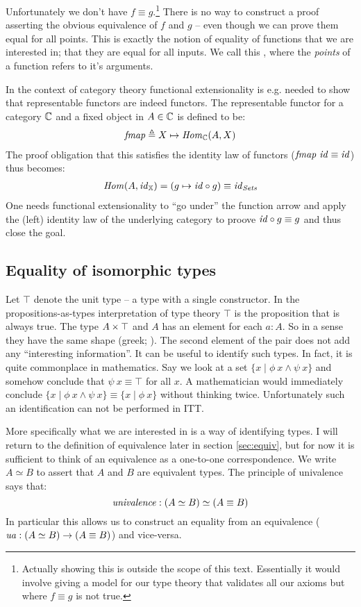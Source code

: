 Unfortunately we don't have $f \equiv g$.\footnote{Actually showing this is
outside the scope of this text. Essentially it would involve giving a model
for our type theory that validates all our axioms but where $f \equiv g$ is
not true.} There is no way to construct a proof asserting the obvious
equivalence of $f$ and $g$ -- even though we can prove them equal for all
points. This is exactly the notion of equality of functions that we are
interested in; that they are equal for all inputs. We call this
, where the \emph{points} of a function refers
to it's arguments.

In the context of category theory functional extensionality is e.g. needed to
show that representable functors are indeed functors. The representable functor
for a category $\mathbb{C}$ and a fixed object in $A \in \mathbb{C}$ is defined to be:
%
\begin{align*}
\mathit{fmap} \mathrel{\triangleq} X \mapsto \mathit{Hom}_{\mathbb{C}}(A, X)
\end{align*}
%
The proof obligation that this satisfies the identity law of functors
($\mathit{fmap}\ \mathit{id} \equiv \mathit{id}$) thus becomes:
%
\begin{align*}
\mathit{Hom}(A, \mathit{id}_{\mathbb{X}}) = (g \mapsto \mathit{id} \circ g) \equiv \mathit{id}_{\mathit{Sets}}
\end{align*}
%
One needs functional extensionality to ``go under'' the function arrow and apply
the (left) identity law of the underlying category to proove $\mathit{id} \circ g
\equiv g$ and thus close the goal.
%
\subsection{Equality of isomorphic types}
%
Let $\top$ denote the unit type -- a type with a single constructor. In the
propositions-as-types interpretation of type theory $\top$ is the proposition
that is always true. The type $A \times \top$ and $A$ has an element for each $a :
A$. So in a sense they have the same shape (greek; ). The
second element of the pair does not add any ``interesting information''. It can
be useful to identify such types. In fact, it is quite commonplace in
mathematics. Say we look at a set $\{x \mid \phi\ x \land \psi\ x\}$ and somehow
conclude that $\psi\ x \equiv \top$ for all $x$. A mathematician would
immediately conclude $\{x \mid \phi\ x \land \psi\ x\} \equiv \{x \mid
\phi\ x\}$ without thinking twice. Unfortunately such an identification can not
be performed in ITT.

More specifically what we are interested in is a way of identifying
 types. I will return to the definition of equivalence later
in section \ref{sec:equiv}, but for now it is sufficient to think of an
equivalence as a one-to-one correspondence. We write $A \simeq B$ to assert that
$A$ and $B$ are equivalent types. The principle of univalence says that:
%
$$\mathit{univalence} \mathrel{:} (A \simeq B) \simeq (A \equiv B)$$
%
In particular this allows us to construct an equality from an equivalence
($\mathit{ua} \mathrel{:} (A \simeq B) \to (A \equiv B)$) and vice-versa.

